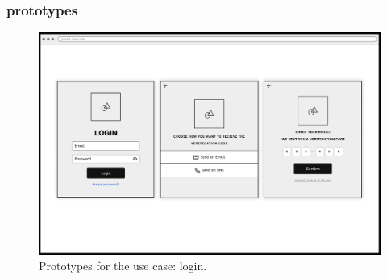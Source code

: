 \documentclass[]{uc2pfecaneva}
\begin{document}
    \subsubsection{prototypes}
    \begin{figure}[h]

        \centering
        \includegraphics[width=\textwidth]{images/login1}

        \caption{Prototypes for the use case: login.}
    \end{figure}
    \clearpage
\end{document}

